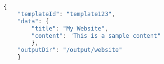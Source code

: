 \begin{lstlisting}[language=Javascript,caption={Request Data untuk Endpoint `POST /generate`}]
{
    "templateId": "template123",
    "data": {
        "title": "My Website",
        "content": "This is a sample content"
        },
    "outputDir": "/output/website"
    }
\end{lstlisting}